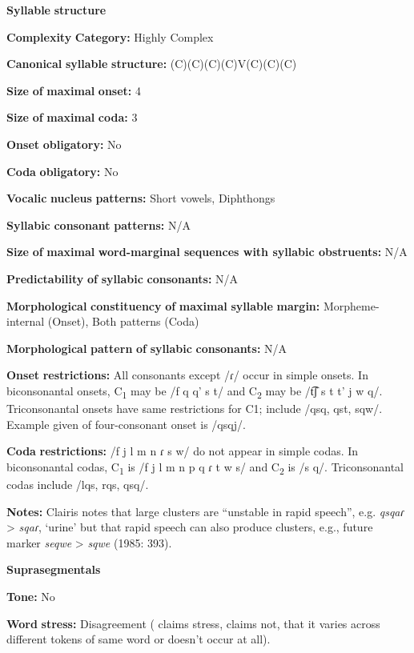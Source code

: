 \textbf{Syllable} \textbf{structure}

\textbf{Complexity} \textbf{Category:} Highly Complex

\textbf{Canonical} \textbf{syllable} \textbf{structure:} (C)(C)(C)(C)V(C)(C)(C) \citep[391-401]{Clairis1985}

\textbf{Size} \textbf{of} \textbf{maximal} \textbf{onset:} 4

\textbf{Size} \textbf{of} \textbf{maximal} \textbf{coda:} 3

\textbf{Onset} \textbf{obligatory:} No

\textbf{Coda} \textbf{obligatory:} No

\textbf{Vocalic} \textbf{nucleus} \textbf{patterns:} Short vowels, Diphthongs

\textbf{Syllabic} \textbf{consonant} \textbf{patterns:} N/A

\textbf{Size} \textbf{of} \textbf{maximal} \textbf{word{}-marginal sequences with syllabic obstruents:} N/A

\textbf{Predictability} \textbf{of} \textbf{syllabic} \textbf{consonants:} N/A 

\textbf{Morphological} \textbf{constituency} \textbf{of} \textbf{maximal} \textbf{syllable} \textbf{margin:} Morpheme-internal (Onset), Both patterns (Coda)

\textbf{Morphological} \textbf{pattern} \textbf{of} \textbf{syllabic} \textbf{consonants:} N/A

\textbf{Onset} \textbf{restrictions:} All consonants except /ɾ/ occur in simple onsets. In biconsonantal onsets, C\textsubscript{1} may be /f q q' s t/ and C\textsubscript{2} may be /t͡ʃ s t t' j w q/. Triconsonantal onsets have same restrictions for C1; include /qsq, qst, sqw/. Example given of four-consonant onset is /qsqj/.

\textbf{Coda} \textbf{restrictions:} /f j l m n ɾ s w/ do not appear in simple codas. In biconsonantal codas, C\textsubscript{1} is /f j l m n p q ɾ t w s/ and C\textsubscript{2} is /s q/. Triconsonantal codas include /lqs, rqs, qsq/.

\textbf{Notes:} Clairis notes that large clusters are “unstable in rapid speech”, e.g. \textit{qsqaɾ} > \textit{sqaɾ}, ‘urine’ but that rapid speech can also produce clusters, e.g., future marker \textit{seqwe} > \textit{sqwe} (1985: 393).

\textbf{Suprasegmentals}

\textbf{Tone:} No

\textbf{Word} \textbf{stress:} Disagreement (\citealt{Clairis1977} claims stress, \citealt{Clairis1985} claims not, that it varies across different tokens of same word or doesn’t occur at all).

